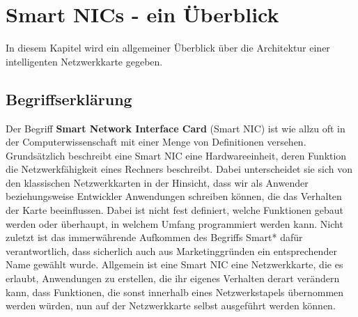 %
%

\chapter{Smart NICs - ein Überblick}
\label{cha:background}
In diesem Kapitel wird ein allgemeiner Überblick über die Architektur einer intelligenten Netzwerkkarte gegeben.

\section{Begriffserklärung}
Der Begriff \textbf{Smart Network Interface Card} (Smart NIC) ist wie allzu oft in der Computerwissenschaft mit einer Menge von Definitionen versehen. Grundsätzlich beschreibt eine Smart NIC eine Hardwareeinheit, deren Funktion die Netzwerkfähigkeit eines Rechners beschreibt. Dabei unterscheidet sie sich von den klassischen Netzwerkkarten in der Hinsicht, dass wir als Anwender beziehungsweise Entwickler Anwendungen schreiben können, die das Verhalten der Karte beeinflussen. Dabei ist nicht fest definiert, welche Funktionen gebaut werden oder überhaupt, in welchem Umfang programmiert werden kann. Nicht zuletzt ist das immerwährende Aufkommen des Begriffs Smart* dafür verantwortlich, dass sicherlich auch aus Marketinggründen ein entsprechender Name gewählt wurde. Allgemein ist eine Smart NIC eine Netzwerkkarte, die es erlaubt, Anwendungen zu erstellen, die ihr eigenes Verhalten derart verändern kann, dass Funktionen, die sonst innerhalb eines Netzwerkstapels übernommen werden würden, nun auf der Netzwerkkarte selbst ausgeführt werden können. \cite{smartnicsComproSurvey}

